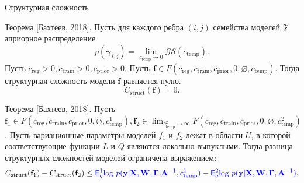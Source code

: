 \documentclass[usenames,dvipsnames,11pt,pdf,utf8,russian,aspectratio=43]{beamer}
\begin{document}
\begin{frame}{Структурная сложность}
\small

\begin{block}{Теорема  [Бахтеев, 2018].}
Пусть для каждого ребра $(i,j)$ семейства моделей $\mathfrak{F}$ априорное распределение $$p(\boldsymbol{\gamma}_{i,j}) =  \lim_{c_{\text{temp}} \to 0} \mathcal{GS}(c_{\text{temp}}).$$
Пусть $c_{\text{reg}} >0, c_{\text{train}} >0, c_{\text{prior}}>0$.
Пусть $\mathbf{f} \in F(c_{\text{reg}}, c_{\text{train}}, c_{\text{prior}}, 0, \varnothing, c_{\text{temp}})$.
Тогда структурная сложность модели $\mathbf{f}$ равняется нулю.
\[
    C_\text{struct}(\mathbf{f}) = 0.
\]
\end{block}

\begin{block}{Теорема [Бахтеев, 2018].}
Пусть $\mathbf{f}_1 \in F(c_{\text{reg}}, c_{\text{train}},  c_{\text{prior}}, 0, \varnothing,  c^1_{\text{temp}}), \mathbf{f}_2   \in \lim_{c^2_{\text{temp}} \to \infty} F(c_{\text{reg}}, c_{\text{train}},  c_{\text{prior}}, 0, \varnothing,  c^2_{\text{temp}})$.
Пусть вариационные параметры моделей $f_1$ и $f_2$ лежат в области $U$, в которой соответствующие функции $L$ и $Q$ являются локально-выпуклыми. 
Тогда разница структурных сложностей моделей ограничена выражением:
\[
    C_\text{struct}(\mathbf{f}_1)  - C_\text{struct}(\mathbf{f}_2) \leq \textcolor{blue}{\mathsf{E}_q^1 \text{log}~{p(\mathbf{y} | \mathbf{X}, \mathbf{W}, \boldsymbol{\Gamma}. \mathbf{A}^{-1}, c^1_{\text{temp}})}} - \textcolor{blue}{\mathsf{E}_q^2 \text{log}~{p(\mathbf{y} | \mathbf{X}, \mathbf{W}, \boldsymbol{\Gamma}, \mathbf{A}^{-1})}}.
\]
\end{block}

\end{frame}
\end{document}
